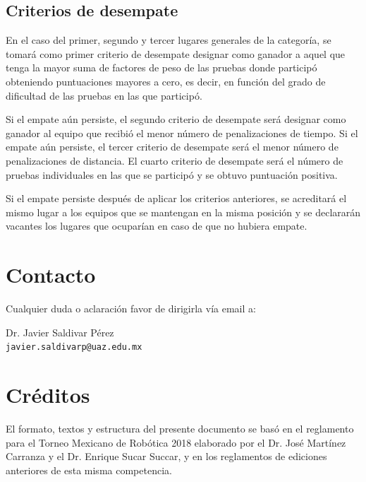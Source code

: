 \documentclass[letterpaper,12pt]{article}
\begin{document}
\subsection{Criterios de desempate}
En el caso del primer, segundo y tercer lugares generales de la categoría, se tomará como primer criterio de desempate designar como ganador a aquel que tenga la mayor suma de factores de peso de las pruebas donde participó obteniendo puntuaciones mayores a cero, es decir, en función del grado de dificultad de las pruebas en las que participó.

Si el empate aún persiste, el segundo criterio de desempate será designar como ganador al equipo que recibió el menor número de penalizaciones de tiempo. Si el empate aún persiste, el tercer criterio de desempate será el menor número de penalizaciones de distancia. El cuarto criterio de desempate será el número de pruebas individuales en las que se participó y se obtuvo puntuación positiva.

Si el empate persiste después de aplicar los criterios anteriores, se acreditará el mismo lugar a los equipos que se mantengan en la misma posición y se declararán vacantes los lugares que ocuparían en caso de que no hubiera empate.


\section{Contacto}

\noindent
\begin{minipage}{\linewidth}
Cualquier duda o aclaración favor de dirigirla vía email a:

Dr. Javier Saldivar Pérez\\
\texttt{javier.saldivarp@uaz.edu.mx}
\end{minipage}


\section*{Créditos}
El formato, textos y estructura del presente documento se basó en el reglamento para el Torneo Mexicano de Robótica 2018 elaborado por el Dr. José Martínez Carranza y el Dr. Enrique Sucar Succar, y en los reglamentos de ediciones anteriores de esta misma competencia. 
\end{document}
